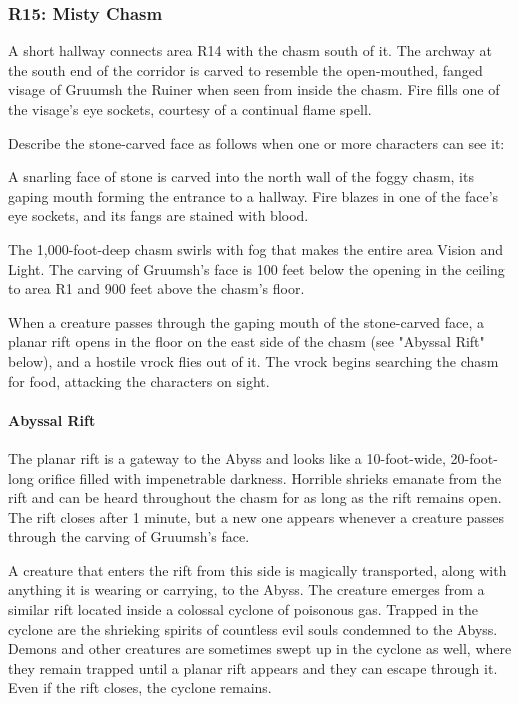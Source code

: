 \documentclass[10pt,a4paper,twoside,bg=print,twocolumn,openany,nodeprecatedcode]{dndbook}
\begin{document}
\subsubsection{R15: Misty Chasm}
A short hallway connects area R14 with the chasm south of it. The archway at the south end of the corridor is carved to resemble the open-mouthed, fanged visage of Gruumsh the Ruiner when seen from inside the chasm. Fire fills one of the visage's eye sockets, courtesy of a continual flame spell.

Describe the stone-carved face as follows when one or more characters can see it:

\begin{DndReadAloud}{}
A snarling face of stone is carved into the north wall of the foggy chasm, its gaping mouth forming the entrance to a hallway. Fire blazes in one of the face's eye sockets, and its fangs are stained with blood.

\end{DndReadAloud}

The 1,000-foot-deep chasm swirls with fog that makes the entire area Vision and Light. The carving of Gruumsh's face is 100 feet below the opening in the ceiling to area R1 and 900 feet above the chasm's floor.

When a creature passes through the gaping mouth of the stone-carved face, a planar rift opens in the floor on the east side of the chasm (see "Abyssal Rift" below), and a hostile vrock flies out of it. The vrock begins searching the chasm for food, attacking the characters on sight.

\paragraph{Abyssal Rift}
The planar rift is a gateway to the Abyss and looks like a 10-foot-wide, 20-foot-long orifice filled with impenetrable darkness. Horrible shrieks emanate from the rift and can be heard throughout the chasm for as long as the rift remains open. The rift closes after 1 minute, but a new one appears whenever a creature passes through the carving of Gruumsh's face.

A creature that enters the rift from this side is magically transported, along with anything it is wearing or carrying, to the Abyss. The creature emerges from a similar rift located inside a colossal cyclone of poisonous gas. Trapped in the cyclone are the shrieking spirits of countless evil souls condemned to the Abyss. Demons and other creatures are sometimes swept up in the cyclone as well, where they remain trapped until a planar rift appears and they can escape through it. Even if the rift closes, the cyclone remains.
\end{document}
